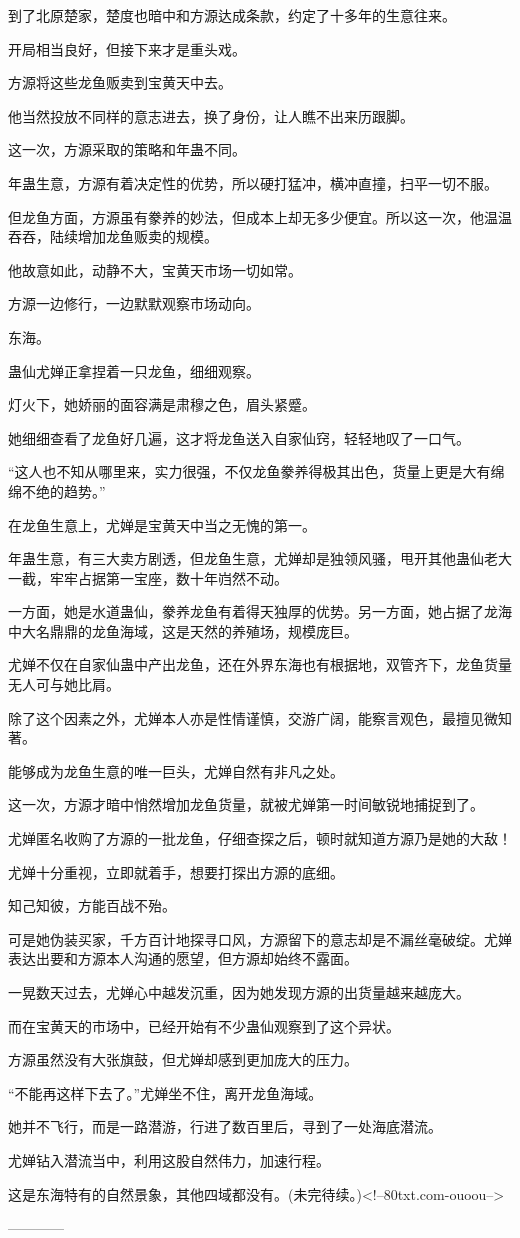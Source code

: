\begin{this_body}
到了北原楚家，楚度也暗中和方源达成条款，约定了十多年的生意往来。

开局相当良好，但接下来才是重头戏。

方源将这些龙鱼贩卖到宝黄天中去。

他当然投放不同样的意志进去，换了身份，让人瞧不出来历跟脚。

这一次，方源采取的策略和年蛊不同。

年蛊生意，方源有着决定性的优势，所以硬打猛冲，横冲直撞，扫平一切不服。

但龙鱼方面，方源虽有豢养的妙法，但成本上却无多少便宜。所以这一次，他温温吞吞，陆续增加龙鱼贩卖的规模。

他故意如此，动静不大，宝黄天市场一切如常。

方源一边修行，一边默默观察市场动向。

东海。

蛊仙尤婵正拿捏着一只龙鱼，细细观察。

灯火下，她娇丽的面容满是肃穆之色，眉头紧蹙。

她细细查看了龙鱼好几遍，这才将龙鱼送入自家仙窍，轻轻地叹了一口气。

“这人也不知从哪里来，实力很强，不仅龙鱼豢养得极其出色，货量上更是大有绵绵不绝的趋势。”

在龙鱼生意上，尤婵是宝黄天中当之无愧的第一。

年蛊生意，有三大卖方剧透，但龙鱼生意，尤婵却是独领风骚，甩开其他蛊仙老大一截，牢牢占据第一宝座，数十年岿然不动。

一方面，她是水道蛊仙，豢养龙鱼有着得天独厚的优势。另一方面，她占据了龙海中大名鼎鼎的龙鱼海域，这是天然的养殖场，规模庞巨。

尤婵不仅在自家仙蛊中产出龙鱼，还在外界东海也有根据地，双管齐下，龙鱼货量无人可与她比肩。

除了这个因素之外，尤婵本人亦是性情谨慎，交游广阔，能察言观色，最擅见微知著。

能够成为龙鱼生意的唯一巨头，尤婵自然有非凡之处。

这一次，方源才暗中悄然增加龙鱼货量，就被尤婵第一时间敏锐地捕捉到了。

尤婵匿名收购了方源的一批龙鱼，仔细查探之后，顿时就知道方源乃是她的大敌！

尤婵十分重视，立即就着手，想要打探出方源的底细。

知己知彼，方能百战不殆。

可是她伪装买家，千方百计地探寻口风，方源留下的意志却是不漏丝毫破绽。尤婵表达出要和方源本人沟通的愿望，但方源却始终不露面。

一晃数天过去，尤婵心中越发沉重，因为她发现方源的出货量越来越庞大。

而在宝黄天的市场中，已经开始有不少蛊仙观察到了这个异状。

方源虽然没有大张旗鼓，但尤婵却感到更加庞大的压力。

“不能再这样下去了。”尤婵坐不住，离开龙鱼海域。

她并不飞行，而是一路潜游，行进了数百里后，寻到了一处海底潜流。

尤婵钻入潜流当中，利用这股自然伟力，加速行程。

这是东海特有的自然景象，其他四域都没有。(未完待续。)<!--80txt.com-ouoou-->

------------

\end{this_body}

